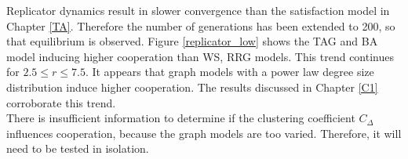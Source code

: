 Replicator dynamics result in slower convergence than the satisfaction model in Chapter \ref{TA}. Therefore the number of generations has been extended to 200, so that equilibrium is observed. Figure \ref{replicator_low} shows the TAG and BA model inducing higher cooperation than WS, RRG models. This trend continues for $2.5 \leq r \leq 7.5$. It appears that graph models with a power law degree size distribution induce higher cooperation. The results discussed in Chapter \ref{C1} corroborate this trend. \\

There is insufficient information to determine if the clustering coefficient $C_\Delta$ influences cooperation, because the graph models are too varied. Therefore, it will need to be tested in isolation.\\

